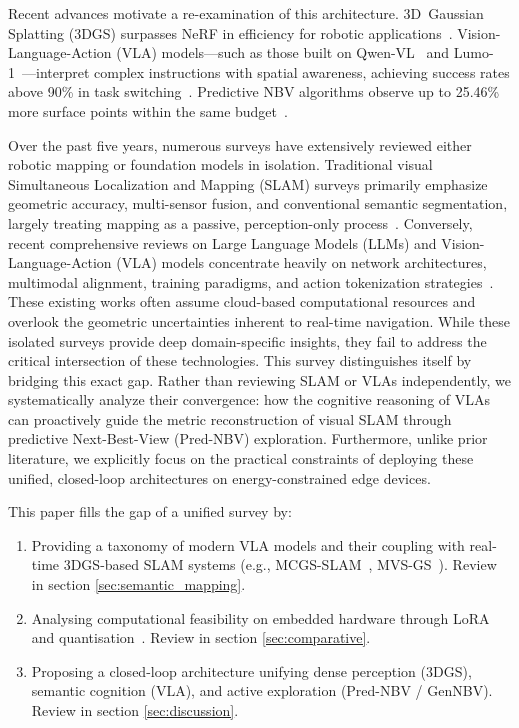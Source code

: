 \documentclass[conference]{IEEEtran}
\begin{document}
Recent advances motivate a re-examination of this architecture.
3D~Gaussian Splatting (3DGS) surpasses NeRF in efficiency for robotic applications~\cite{liu2025survey3dgs, atik2025comparative}.
Vision-Language-Action (VLA) models---such as those built on Qwen-VL~\cite{bai2025qwen3vl} and Lumo-1~\cite{astribot2025lumo}---interpret complex instructions with spatial awareness, achieving success rates above 90\% in task switching~\cite{li2025switchvla}.
Predictive NBV algorithms observe up to 25.46\% more surface points within the same budget~\cite{dhami2023prednbv, chen2024gennbv}.

Over the past five years, numerous surveys have extensively reviewed either robotic mapping or foundation models in isolation. Traditional visual Simultaneous Localization and Mapping (SLAM) surveys primarily emphasize geometric accuracy, multi-sensor fusion, and conventional semantic segmentation, largely treating mapping as a passive, perception-only process~\cite{slam_surveys_2024}. Conversely, recent comprehensive reviews on Large Language Models (LLMs) and Vision-Language-Action (VLA) models concentrate heavily on network architectures, multimodal alignment, training paradigms, and action tokenization strategies~\cite{vla_survey_ma_2024, zhang2025purevla}. These existing works often assume cloud-based computational resources and overlook the geometric uncertainties inherent to real-time navigation. While these isolated surveys provide deep domain-specific insights, they fail to address the critical intersection of these technologies. This survey distinguishes itself by bridging this exact gap. Rather than reviewing SLAM or VLAs independently, we systematically analyze their convergence: how the cognitive reasoning of VLAs can proactively guide the metric reconstruction of visual SLAM through predictive Next-Best-View (Pred-NBV) exploration. Furthermore, unlike prior literature, we explicitly focus on the practical constraints of deploying these unified, closed-loop architectures on energy-constrained edge devices.

This paper fills the gap of a unified survey by:
\begin{enumerate}
	\item Providing a taxonomy of modern VLA models and their coupling with real-time 3DGS-based SLAM systems (e.g., MCGS-SLAM~\cite{cao2024mcgs}, MVS-GS~\cite{lee2025mvsgs}). Review in section \ref{sec:semantic_mapping}.
	\item Analysing computational feasibility on embedded hardware through LoRA and quantisation~\cite{reviewVLArobotics}. Review in section \ref{sec:comparative}.
	\item Proposing a closed-loop architecture unifying dense perception (3DGS), semantic cognition (VLA), and active exploration (Pred-NBV / GenNBV). Review in section \ref{sec:discussion}.
\end{enumerate}
\end{document}
